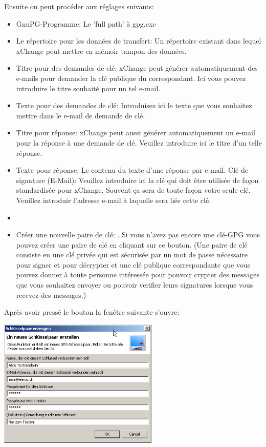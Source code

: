 Ensuite on peut procéder aux réglages suivants:
\begin{itemize}
 \item GnuPG-Programme: Le 'full path' à gpg.exe
\item Le répertoire pour les données de transfert: Un répertoire existant dans lequel xChange peut mettre en mémoir tampon des données.
\item Titre pour des demandes de clé: xChange peut générer automatiquement des e-mails pour demander la clé publique du correspondant. Ici vous pouvez introduire le titre souhaité pour un tel e-mail.
\item Texte pour des demandes de clé: Introduisez ici le texte que vous souhaitez mettre dans le e-mail de demande de clé.
\item Titre pour réponse: xChange peut aussi générer automatiquement un e-mail pour la réponse à une demande de clé. Veuillez introduire ici le titre d'un telle réponse.
\item Texte pour réponse: Le contenu du texte d'une réponse par e-mail.
 Clé de signature (E-Mail): Veuillez introduire ici la clé qui doit être utilisée de façon standardisée pour xChange. Souvent ça sera de toute façon votre seule clé. Veuillez introduir l'adresse e-mail à laquelle sera liée cette clé.

\item
\item Créer une nouvelle paire de clé:  . Si vous n'avez pas encore une clé-GPG vous pouvez créer une paire de clé en cliquant sur ce bouton. (Une paire de clé consiste en une clé privée qui est sécurisée par un mot de passe nécessaire pour signer et pour décrypter et une clé publique correspondante que vous pouvez donner à toute personne intéressée pour pouvoir crypter des messages que vous souhaitez envoyer ou pouvoir verifier leurs signatures lorsque vous recevez des messages.)
\end{itemize}

Après avoir pressé le bouton la fenêtre suivante s'ouvre:

\includegraphics[width=3in]{images/xc2.png}

